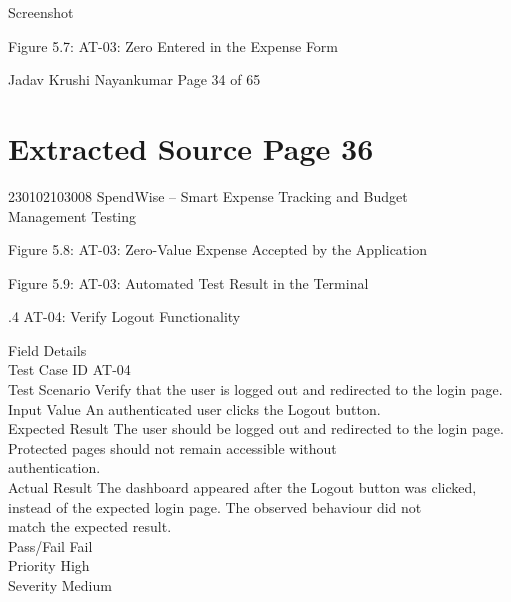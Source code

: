 \documentclass[12pt,a4paper]{report}
\begin{document}
\smallskip

\smallskip
Screenshot\\ 

\smallskip

\smallskip

\smallskip

\smallskip
Figure 5.7: AT-03: Zero Entered in the Expense Form\\ 

\smallskip

\smallskip
Jadav Krushi Nayankumar                                                       Page 34 of 65\\ 

\clearpage
\section*{Extracted Source Page 36}
230102103008                         SpendWise – Smart Expense Tracking and Budget\\ 
Management Testing\\ 

\smallskip

\smallskip

\smallskip

\smallskip
Figure 5.8: AT-03: Zero-Value Expense Accepted by the Application\\ 

\smallskip

\smallskip

\smallskip

\smallskip
Figure 5.9: AT-03: Automated Test Result in the Terminal\\ 

\smallskip

\smallskip

.4 AT-04: Verify Logout Functionality\\ 

\smallskip

\smallskip
Field                    Details\\ 
Test Case ID             AT-04\\ 
Test Scenario            Verify that the user is logged out and redirected to the login page.\\ 
Input Value              An authenticated user clicks the Logout button.\\ 
Expected Result          The user should be logged out and redirected to the login page.\\ 
Protected pages should not remain accessible without\\ 
authentication.\\ 
Actual Result            The dashboard appeared after the Logout button was clicked,\\ 
instead of the expected login page. The observed behaviour did not\\ 
match the expected result.\\ 
Pass/Fail                Fail\\ 
Priority                 High\\ 
Severity                 Medium\\ 
\end{document}
